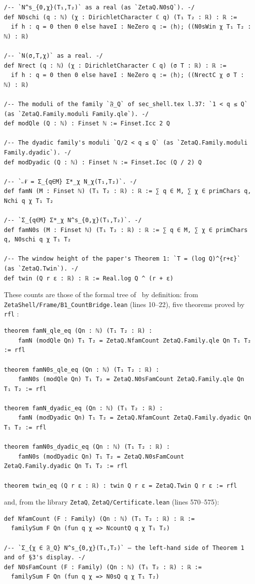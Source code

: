 \begin{Verbatim}[fontsize=\footnotesize,breaklines,frame=single,framesep=2mm]
/-- `N^s_{0,χ}(T₁,T₂)` as a real (as `ZetaQ.N0sQ`). -/
def N0schi (q : ℕ) (χ : DirichletCharacter ℂ q) (T₁ T₂ : ℝ) : ℝ :=
  if h : q = 0 then 0 else haveI : NeZero q := ⟨h⟩; ((N0sWin χ T₁ T₂ : ℕ) : ℝ)

/-- `N(σ,T,χ)` as a real. -/
def Nrect (q : ℕ) (χ : DirichletCharacter ℂ q) (σ T : ℝ) : ℝ :=
  if h : q = 0 then 0 else haveI : NeZero q := ⟨h⟩; ((NrectC χ σ T : ℕ) : ℝ)

/-- The moduli of the family `𝔉_Q` of sec_shell.tex l.37: `1 < q ≤ Q` (as `ZetaQ.Family.moduli Family.qle`). -/
def modQle (Q : ℕ) : Finset ℕ := Finset.Icc 2 Q

/-- The dyadic family's moduli `Q/2 < q ≤ Q` (as `ZetaQ.Family.moduli Family.dyadic`). -/
def modDyadic (Q : ℕ) : Finset ℕ := Finset.Ioc (Q / 2) Q

/-- `𝒩 = Σ_{q∈M} Σ*_χ N_χ(T₁,T₂)`. -/
def famN (M : Finset ℕ) (T₁ T₂ : ℝ) : ℝ := ∑ q ∈ M, ∑ χ ∈ primChars q, Nchi q χ T₁ T₂

/-- `Σ_{q∈M} Σ*_χ N^s_{0,χ}(T₁,T₂)`. -/
def famN0s (M : Finset ℕ) (T₁ T₂ : ℝ) : ℝ := ∑ q ∈ M, ∑ χ ∈ primChars q, N0schi q χ T₁ T₂

/-- The window height of the paper's Theorem 1: `T = (log Q)^{r+ε}` (as `ZetaQ.Twin`). -/
def twin (Q r ε : ℝ) : ℝ := Real.log Q ^ (r + ε)
\end{Verbatim}
These counts are those of the formal tree of~\cite{DSouza} by definition: from \texttt{ZetaShell/Frame/B1\_CountBridge.lean} (lines 10--22), five theorems proved by \texttt{rfl}
\tagL:
\begin{Verbatim}[fontsize=\footnotesize,breaklines,frame=single,framesep=2mm]
theorem famN_qle_eq (Qn : ℕ) (T₁ T₂ : ℝ) :
    famN (modQle Qn) T₁ T₂ = ZetaQ.NfamCount ZetaQ.Family.qle Qn T₁ T₂ := rfl

theorem famN0s_qle_eq (Qn : ℕ) (T₁ T₂ : ℝ) :
    famN0s (modQle Qn) T₁ T₂ = ZetaQ.N0sFamCount ZetaQ.Family.qle Qn T₁ T₂ := rfl

theorem famN_dyadic_eq (Qn : ℕ) (T₁ T₂ : ℝ) :
    famN (modDyadic Qn) T₁ T₂ = ZetaQ.NfamCount ZetaQ.Family.dyadic Qn T₁ T₂ := rfl

theorem famN0s_dyadic_eq (Qn : ℕ) (T₁ T₂ : ℝ) :
    famN0s (modDyadic Qn) T₁ T₂ = ZetaQ.N0sFamCount ZetaQ.Family.dyadic Qn T₁ T₂ := rfl

theorem twin_eq (Q r ε : ℝ) : twin Q r ε = ZetaQ.Twin Q r ε := rfl
\end{Verbatim}
and, from the library \texttt{ZetaQ}, \texttt{ZetaQ/Certificate.lean} (lines 570--575):
\begin{Verbatim}[fontsize=\footnotesize,breaklines,frame=single,framesep=2mm]
def NfamCount (F : Family) (Qn : ℕ) (T₁ T₂ : ℝ) : ℝ :=
  familySum F Qn (fun q χ => NcountQ q χ T₁ T₂)

/-- `Σ_{χ ∈ 𝔉_Q} N^s_{0,χ}(T₁,T₂)` — the left-hand side of Theorem 1 and of §3's display. -/
def N0sFamCount (F : Family) (Qn : ℕ) (T₁ T₂ : ℝ) : ℝ :=
  familySum F Qn (fun q χ => N0sQ q χ T₁ T₂)
\end{Verbatim}

